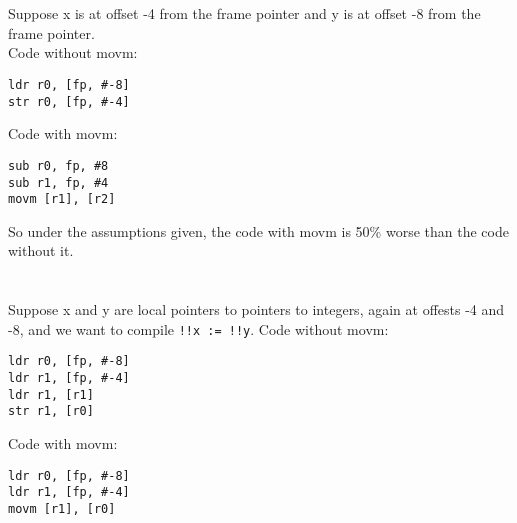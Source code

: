 \section{}
Suppose x is at offset -4 from the frame pointer and y is at offset -8 from the frame pointer. \\
Code without movm:

\begin{lstlisting}
ldr r0, [fp, #-8]
str r0, [fp, #-4]
\end{lstlisting}

Code with movm:

\begin{lstlisting}
sub r0, fp, #8
sub r1, fp, #4
movm [r1], [r2]
\end{lstlisting}

So under the assumptions given, the code with movm is 50\% worse than the code without it.

\section{}
Suppose x and y are local pointers to pointers to integers, again at offests -4 and -8, and we want to compile \texttt{!!x := !!y}.
Code without movm:

\begin{lstlisting}
ldr r0, [fp, #-8]
ldr r1, [fp, #-4]
ldr r1, [r1]
str r1, [r0]
\end{lstlisting}

Code with movm:

\begin{lstlisting}
ldr r0, [fp, #-8]
ldr r1, [fp, #-4]
movm [r1], [r0]
\end{lstlisting}

\section{}

